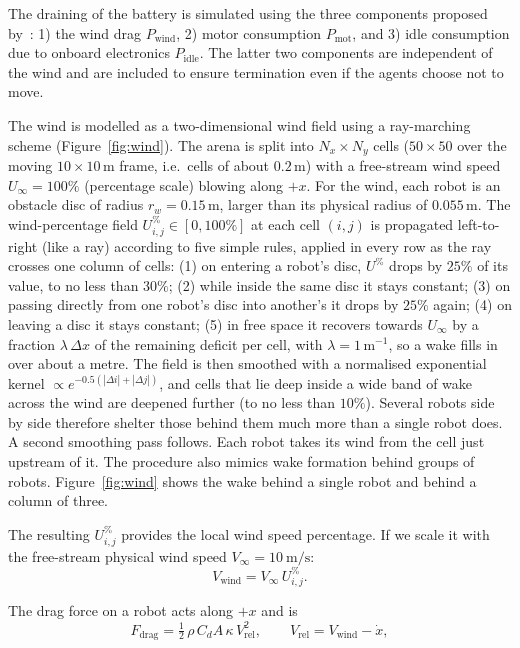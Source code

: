 \documentclass[runningheads]{llncs}
\begin{document}
The draining of the battery is simulated using the three components proposed by~\cite{mahdavi2026energy}: 1) the wind drag $P_\text{wind}$, 2) motor consumption $P_\text{mot}$, and 3) idle consumption due to onboard electronics $P_\text{idle}$. The latter two components are independent of the wind and are included to ensure termination even if the agents choose not to move. 

The wind is modelled as a two-dimensional wind field using a ray-marching scheme (Figure~\ref{fig:wind}). The arena is split into $N_x \times N_y$ cells ($50 \times 50$ over the moving $10 \times 10$\,m frame, i.e.\ cells of about $0.2$\,m) with a free-stream wind speed $U_\infty=100\%$ (percentage scale) blowing along $+x$. For the wind, each robot is an obstacle disc of radius $r_w = 0.15$\,m, larger than its physical radius of $0.055$\,m. The wind-percentage field $U^\%_{i,j}\in[0,100\%]$ at each cell $(i,j)$ is propagated left-to-right (like a ray) according to five simple rules, applied in every row as the ray crosses one column of cells: (1) on entering a robot's disc, $U^\%$ drops by $25\%$ of its value, to no less than $30\%$; (2) while inside the same disc it stays constant; (3) on passing directly from one robot's disc into another's it drops by $25\%$ again; (4) on leaving a disc it stays constant; (5) in free space it recovers towards $U_\infty$ by a fraction $\lambda\,\Delta x$ of the remaining deficit per cell, with $\lambda = 1\,\text{m}^{-1}$, so a wake fills in over about a metre. The field is then smoothed with a normalised exponential kernel $\propto e^{-0.5(|\Delta i| + |\Delta j|)}$, and cells that lie deep inside a wide band of wake across the wind are deepened further (to no less than $10\%$). Several robots side by side therefore shelter those behind them much more than a single robot does. A second smoothing pass follows. Each robot takes its wind from the cell just upstream of it. The procedure also mimics wake formation behind groups of robots. Figure~\ref{fig:wind} shows the wake behind a single robot and behind a column of three.

The resulting $U^\%_{i,j}$ provides the local wind speed percentage. If we scale it with the free-stream physical wind speed $V_\infty = 10~\text{m/s}$:
\begin{equation}
V_{\text{wind}} = V_\infty\,U^\%_{i,j}.
\label{eq:vwind_compact}
\end{equation}

The drag force on a robot acts along $+x$ and is
\begin{equation}
F_{\text{drag}} = \tfrac{1}{2}\,\rho\,C_dA\,\kappa\,V_{\text{rel}}^{2}, \qquad V_{\text{rel}} = V_{\text{wind}} - \dot{x},
\label{eq:fdrag_compact}
\end{equation}
\end{document}
